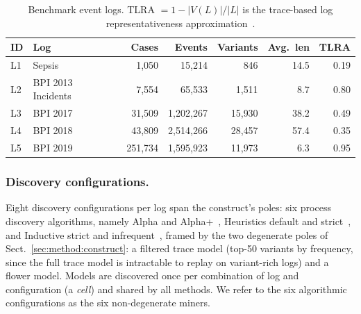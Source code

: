 \documentclass[runningheads]{llncs}
\begin{document}
\begin{table}[t]
\centering
\caption{Benchmark event logs. TLRA $=1-|V(L)|/|L|$ is the trace-based log representativeness approximation~\cite{karunaratne2024representativeness}.}
\label{tab:datasets}
\setlength{\tabcolsep}{3pt}
\footnotesize
\begin{tabular}{@{}llrrrrr@{}}
\toprule
ID & Log & Cases & Events & Variants & Avg.\ len & TLRA \\
\midrule
L1 & Sepsis~\cite{mannhardt2016sepsis} & 1{,}050 & 15{,}214 & 846 & 14.5 & 0.19 \\
L2 & BPI 2013 Incidents~\cite{steeman2013bpi} & 7{,}554 & 65{,}533 & 1{,}511 & 8.7 & 0.80 \\
L3 & BPI 2017~\cite{vandongen2017bpi} & 31{,}509 & 1{,}202{,}267 & 15{,}930 & 38.2 & 0.49 \\
L4 & BPI 2018~\cite{vandongen2018bpi} & 43{,}809 & 2{,}514{,}266 & 28{,}457 & 57.4 & 0.35 \\
L5 & BPI 2019~\cite{vandongen2019bpi} & 251{,}734 & 1{,}595{,}923 & 11{,}973 & 6.3 & 0.95 \\
\bottomrule
\end{tabular}
\end{table}

\subsubsection{Discovery configurations.}
Eight discovery configurations per log span the construct's poles: six process discovery algorithms, namely Alpha and Alpha+~\cite{vanderaalst2004alpha}, Heuristics default and strict~\cite{weijters2006hm}, and Inductive strict and infrequent~\cite{leemans2013im,leemans2014imf}, framed by the two degenerate poles of Sect.~\ref{sec:method:construct}: a filtered trace model (top-50 variants by frequency, since the full trace model is intractable to replay on variant-rich logs) and a flower model. Models are discovered once per combination of log and configuration (a \emph{cell}) and shared by all methods. We refer to the six algorithmic configurations as the six non-degenerate miners.
\end{document}

